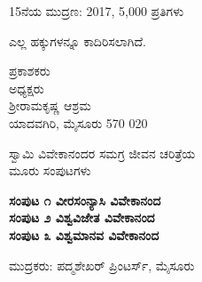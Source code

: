 \thispagestyle{empty}

\begin{center}
15ನೆಯ ಮುದ್ರಣ: 2017, 5,000 ಪ್ರತಿಗಳು
\end{center}

\begin{center}
ಎಲ್ಲ ಹಕ್ಕುಗಳನ್ನೂ ಕಾದಿರಿಸಲಾಗಿದೆ.
\end{center}

\vfill

\begin{center}
ಪ್ರಕಾಶಕರು\\ಅಧ್ಯಕ್ಷರು\\ಶ್ರೀರಾಮಕೃಷ್ಣ ಆಶ್ರಮ\\ಯಾದವಗಿರಿ, ಮೈಸೂರು 570 020
\end{center}

\vfill

\begin{center}
ಸ್ವಾಮಿ ವಿವೇಕಾನಂದರ ಸಮಗ್ರ ಜೀವನ ಚರಿತ್ರೆಯ\\ಮೂರು ಸಂಪುಟಗಳು
\end{center}

\begin{center}
\textbf{ಸಂಪುಟ ೧ ವೀರಸಂನ್ಯಾಸಿ ವಿವೇಕಾನಂದ}\\\textbf{ಸಂಪುಟ ೨ ವಿಶ್ವವಿಜೇತ ವಿವೇಕಾನಂದ}\\\textbf{ಸಂಪುಟ ೩ ವಿಶ್ವಮಾನವ ವಿವೇಕಾನಂದ}
\end{center}

\vfill

\begin{center}
ಮುದ್ರಕರು: ಪದ್ಮಶೇಖರ್ ಪ್ರಿಂಟರ್ಸ್, ಮೈಸೂರು
\end{center}

